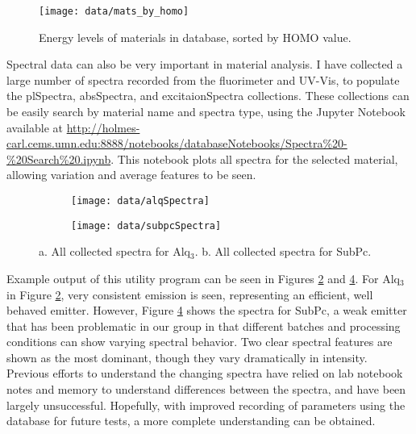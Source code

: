 \documentclass[../thesis.tex]{subfiles}
\begin{document}
\begin{figure}[ht]
\centering
\texttt{[image: data/mats\_by\_homo]}
\caption{Energy levels of materials in database, sorted by HOMO value.}
\label{fig:data_mats_By_homo}
\end{figure}

Spectral data can also be very important in material analysis.  
I have collected a large number of spectra recorded from the fluorimeter and UV-Vis, to populate the plSpectra, absSpectra, and excitaionSpectra collections.
These collections can be easily search by material name and spectra type, using the Jupyter Notebook available at \url{http://holmes-carl.cems.umn.edu:8888/notebooks/databaseNotebooks/Spectra\%20-\%20Search\%20.ipynb}.
This notebook plots all spectra for the selected material, allowing variation and average features to be seen.


\begin{figure}[ht]
\centering
    \begin{subfigure}{.4\textwidth}
    \texttt{[image: data/alqSpectra]}
    \caption{}
    \label{fig:data_alq}\par\vfill
    \end{subfigure}
    \begin{subfigure}{.4\textwidth}
    \texttt{[image: data/subpcSpectra]}
    \caption{}
    \label{fig:data_subpc}\par\vfill
    \end{subfigure}
\caption{  a. All collected spectra for Alq$_3$.  b. All collected spectra for SubPc.}
\end{figure}

Example output of this utility program can be seen in Figures \ref{fig:data_alq} and \ref{fig:data_subpc}.
For Alq$_3$ in Figure \ref{fig:data_alq}, very consistent emission is seen, representing an efficient, well behaved emitter.
However, Figure \ref{fig:data_subpc} shows the spectra for SubPc, a weak emitter that has been problematic in our group in that different batches and processing conditions can show varying spectral behavior.
Two clear spectral features are shown as the most dominant, though they vary dramatically in intensity.
Previous efforts to understand the changing spectra have relied on lab notebook notes and memory to understand differences between the spectra, and have been largely unsuccessful.
Hopefully, with improved recording of parameters using the database for future tests, a more complete understanding can be obtained.
\end{document}
